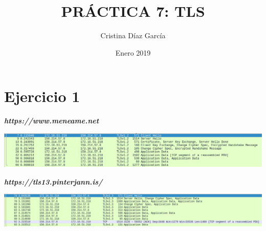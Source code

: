 \documentclass{article}
\title{PRÁCTICA 7: TLS}
\author{Cristina Díaz García}
\date{Enero 2019}
\begin{document}

\begin{titlingpage}
\maketitle
\end{titlingpage}

\newpage

\tableofcontents

\newpage

\section{Ejercicio 1}

\textbf{\textit{https://www.meneame.net}}

\begin{flushleft}
\includegraphics[scale=0.4]{meneame.png}
\end{flushleft}

\textbf{\textit{https://tls13.pinterjann.is/}}

\begin{flushleft}
\includegraphics[scale=0.35]{tls13.png}
\end{flushleft}
\end{document}

